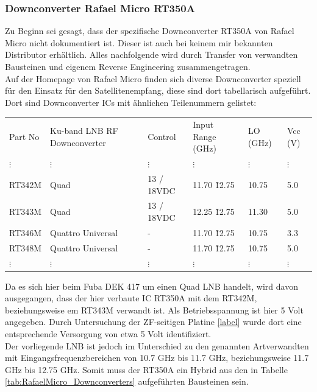 \documentclass[]{article}
\begin{document}
	\subsubsection{Downconverter Rafael Micro RT350A}
		
		\noindent Zu Beginn sei gesagt, dass der spezifische Downconverter RT350A von Rafael Micro nicht dokumentiert ist. Dieser ist auch bei keinem mir bekannten Distributor erhältlich. Alles nachfolgende wird durch Transfer von verwandten Bausteinen und eigenem Reverse Engineering zusammengetragen.\\
		
		\noindent Auf der Homepage von Rafael Micro \cite{RafaelMicro} finden sich diverse Downconverter speziell für den Einsatz für den Satellitenempfang, diese sind dort tabellarisch aufgeführt. Dort sind Downconverter ICs mit ähnlichen Teilenummern gelistet:\\
		
		
		\begin{minipage}{\textwidth}
			{\scriptsize
				\begin{tabular}{llllll}
					Part No & Ku-band LNB RF Downconverter & Control & Input Range (GHz) & LO (GHz) & Vcc (V)\\
					$\vdots$ & $\vdots$ & $\vdots$ & $\vdots$ & $\vdots$ & $\vdots$\\
					RT342M & Quad & 13 / 18VDC & 11.70 \~ 12.75 & 10.75 & 5.0\\
					RT343M & Quad & 13 / 18VDC & 12.25 \~ 12.75 & 11.30 & 5.0\\
					RT346M & Quattro Universal & - & 11.70 \~ 12.75 & 10.75 & 3.3\\
					RT348M & Quattro Universal & - & 11.70 \~ 12.75 & 10.75 & 5.0\\
					$\vdots$ & $\vdots$ & $\vdots$ & $\vdots$ & $\vdots$ & $\vdots$
				\end{tabular}
			}
		\end{minipage}
		
		
		\noindent Da es sich hier beim Fuba DEK 417 um einen Quad LNB handelt, wird davon ausgegangen, dass der hier verbaute IC RT350A mit dem RT342M, beziehungsweise em RT343M verwandt ist. Als Betriebsspannung ist hier 5 Volt angegeben. Durch Untersuchung der ZF-seitigen Platine \ref{label} wurde dort eine entsprechende Versorgung von etwa 5 Volt identifiziert.\\
		
		\noindent Der vorliegende LNB ist jedoch im Unterschied zu den genannten Artverwandten mit Eingangsfrequenzbereichen von 10.7 GHz bis 11.7 GHz, beziehungsweise 11.7 GHz bis 12.75 GHz. Somit muss der RT350A ein Hybrid aus den in Tabelle \ref{tab:RafaelMicro_Downconverters} aufgeführten Bausteinen sein.\\
		
\end{document}

